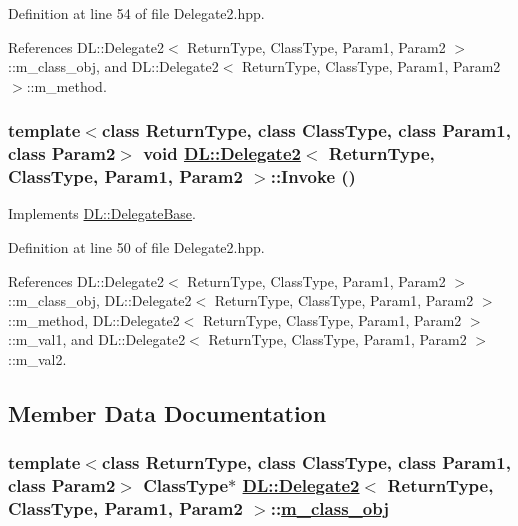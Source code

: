 Definition at line 54 of file Delegate2.hpp.

References DL::Delegate2$<$ Return\-Type, Class\-Type, Param1, Param2 $>$::m\_\-class\_\-obj, and DL::Delegate2$<$ Return\-Type, Class\-Type, Param1, Param2 $>$::m\_\-method.\hypertarget{classDL_1_1Delegate2_a2}{
\subsubsection[Invoke]{\setlength{\rightskip}{0pt plus 5cm}template$<$class Return\-Type, class Class\-Type, class Param1, class Param2$>$ void \hyperlink{classDL_1_1Delegate2}{DL::Delegate2}$<$ Return\-Type, Class\-Type, Param1, Param2 $>$::Invoke ()}}
\label{classDL_1_1Delegate2_a2}




Implements \hyperlink{classDL_1_1DelegateBase_a2}{DL::Delegate\-Base}.

Definition at line 50 of file Delegate2.hpp.

References DL::Delegate2$<$ Return\-Type, Class\-Type, Param1, Param2 $>$::m\_\-class\_\-obj, DL::Delegate2$<$ Return\-Type, Class\-Type, Param1, Param2 $>$::m\_\-method, DL::Delegate2$<$ Return\-Type, Class\-Type, Param1, Param2 $>$::m\_\-val1, and DL::Delegate2$<$ Return\-Type, Class\-Type, Param1, Param2 $>$::m\_\-val2.

\subsection{Member Data Documentation}
\hypertarget{classDL_1_1Delegate2_r0}{
\subsubsection[m\_\-class\_\-obj]{\setlength{\rightskip}{0pt plus 5cm}template$<$class Return\-Type, class Class\-Type, class Param1, class Param2$>$ Class\-Type$\ast$ \hyperlink{classDL_1_1Delegate2}{DL::Delegate2}$<$ Return\-Type, Class\-Type, Param1, Param2 $>$::\hyperlink{classDL_1_1Delegate2_r0}{m\_\-class\_\-obj}}}
\label{classDL_1_1Delegate2_r0}




